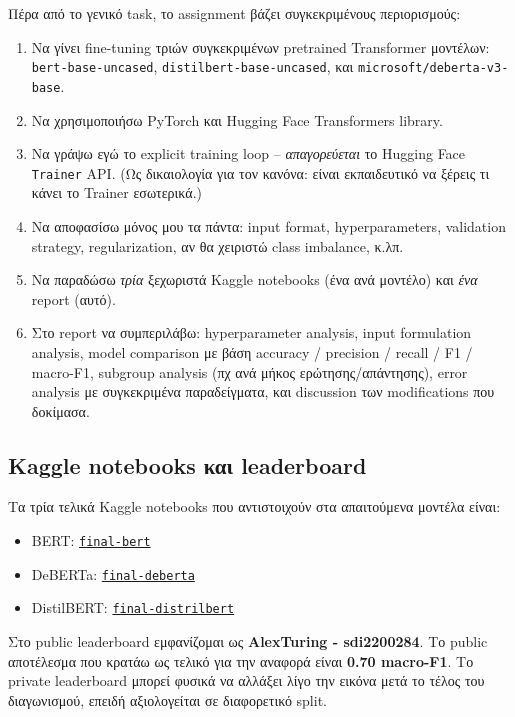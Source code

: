\documentclass[12pt]{fphw}
\begin{document}
Πέρα από το γενικό task, το assignment βάζει συγκεκριμένους περιορισμούς:

\begin{enumerate}
    \item Να γίνει fine-tuning τριών συγκεκριμένων pretrained Transformer μοντέλων: \texttt{bert-base-uncased}, \texttt{distilbert-base-uncased}, και \texttt{microsoft/deberta-v3-base}.
    \item Να χρησιμοποιήσω PyTorch και Hugging Face Transformers library.
    \item Να γράψω εγώ το explicit training loop -- \emph{απαγορεύεται} το Hugging Face \texttt{Trainer} API. (Ως δικαιολογία για τον κανόνα: είναι εκπαιδευτικό να ξέρεις τι κάνει το Trainer εσωτερικά.)
    \item Να αποφασίσω μόνος μου τα πάντα: input format, hyperparameters, validation strategy, regularization, αν θα χειριστώ class imbalance, κ.λπ.
    \item Να παραδώσω \emph{τρία} ξεχωριστά Kaggle notebooks (ένα ανά μοντέλο) και \emph{ένα} report (αυτό).
    \item Στο report να συμπεριλάβω: hyperparameter analysis, input formulation analysis, model comparison με βάση accuracy / precision / recall / F1 / macro-F1, subgroup analysis (πχ ανά μήκος ερώτησης/απάντησης), error analysis με συγκεκριμένα παραδείγματα, και discussion των modifications που δοκίμασα.
\end{enumerate}

\subsection{Kaggle notebooks και leaderboard}

Τα τρία τελικά Kaggle notebooks που αντιστοιχούν στα απαιτούμενα μοντέλα είναι:

\begin{itemize}
    \item BERT: \href{https://www.kaggle.com/code/sdi2200284/final-bert}{\texttt{final-bert}}
    \item DeBERTa: \href{https://www.kaggle.com/code/sdi2200284/final-deberta}{\texttt{final-deberta}}
    \item DistilBERT: \href{https://www.kaggle.com/code/sdi2200284/final-distrilbert/edit}{\texttt{final-distrilbert}}
\end{itemize}

Στο public leaderboard εμφανίζομαι ως \textbf{AlexTuring - sdi2200284}. Το public αποτέλεσμα που κρατάω ως τελικό για την αναφορά είναι \textbf{0.70 macro-F1}. Το private leaderboard μπορεί φυσικά να αλλάξει λίγο την εικόνα μετά το τέλος του διαγωνισμού, επειδή αξιολογείται σε διαφορετικό split.
\end{document}
